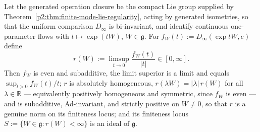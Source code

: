 \documentclass[11pt,a4paper]{article}
\begin{document}
\begin{lemma}
\label{p2:lem:rate-seminorm}
Let the generated operation closure be the compact Lie group supplied by
Theorem~\ref{p2:thm:finite-mode-lie-regularity}, acting by generated
isometries, so that the uniform comparison \(D_\infty\) is bi-invariant,
and identify continuous one-parameter flows with
\(t\mapsto\exp(tW)\), \(W\in\mathfrak g\).  For
\(f_W(t):=D_\infty(\exp tW,e)\) define
\[
r(W):=\limsup_{t\to0}\frac{f_W(t)}{|t|}\in[0,\infty].
\]
Then \(f_W\) is even and subadditive, the limit superior is a limit and
equals \(\sup_{t>0}f_W(t)/t\); \(r\) is absolutely homogeneous,
\(r(\lambda W)=\lvert\lambda\rvert\,r(W)\) for all \(\lambda\in\mathbb R\)
--- equivalently positively homogeneous and symmetric, since \(f_W\) is even
--- and is subadditive, Ad-invariant, and strictly positive on \(W\ne0\), so
that \(r\) is a genuine norm on its finiteness locus; and its
finiteness locus
\(S:=\{W\in\mathfrak g:r(W)<\infty\}\) is an ideal of \(\mathfrak g\).
\end{lemma}
\end{document}
